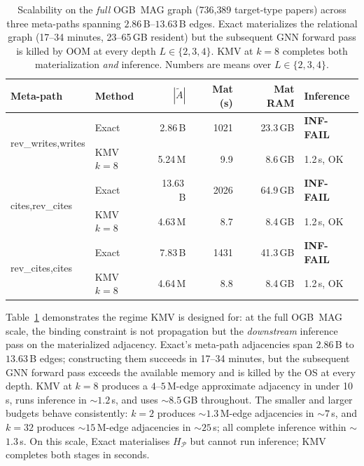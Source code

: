 \documentclass[sigconf]{acmart}
\begin{document}
\begin{table}[t]
\caption{Scalability on the \emph{full} OGB~MAG graph (736{,}389 target-type papers) across three meta-paths spanning $2.86$\,B--$13.63$\,B edges. Exact materializes the relational graph (17--34 minutes, 23--65\,GB resident) but the subsequent GNN forward pass is killed by OOM at every depth $L \in \{2,3,4\}$. KMV at $k{=}8$ completes both materialization \emph{and} inference. Numbers are means over $L \in \{2,3,4\}$.}
\label{tab:scalability}
\centering\scriptsize
\setlength{\tabcolsep}{4pt}
\begin{tabular}{l l r r r l}
\toprule
Meta-path & Method & $|\widetilde{A}|$ & Mat (s) & Mat RAM & Inference \\
\midrule
\multirow{2}{*}{rev\_writes,writes}
  & Exact       & 2.86\,B & 1021 & 23.3\,GB & \textbf{\color{red}INF-FAIL} \\
  & KMV $k{=}8$ & 5.24\,M & 9.9  & 8.6\,GB  & 1.2\,s, OK \\
\midrule
\multirow{2}{*}{cites,rev\_cites}
  & Exact       & 13.63\,B & 2026 & 64.9\,GB & \textbf{\color{red}INF-FAIL} \\
  & KMV $k{=}8$ & 4.63\,M  & 8.7  & 8.4\,GB  & 1.2\,s, OK \\
\midrule
\multirow{2}{*}{rev\_cites,cites}
  & Exact       & 7.83\,B & 1431 & 41.3\,GB & \textbf{\color{red}INF-FAIL} \\
  & KMV $k{=}8$ & 4.64\,M & 8.8  & 8.4\,GB  & 1.2\,s, OK \\
\bottomrule
\end{tabular}
\end{table}

Table~\ref{tab:scalability} demonstrates the regime KMV is designed for: at the full OGB~MAG~\cite{hu2020ogb} scale, the binding constraint is not propagation but the \emph{downstream} inference pass on the materialized adjacency.
Exact's meta-path adjacencies span $2.86$\,B to $13.63$\,B edges; constructing them succeeds in 17--34 minutes, but the subsequent GNN forward pass exceeds the available memory and is killed by the OS at every depth.
KMV at $k{=}8$ produces a $4$--$5$\,M-edge approximate adjacency in under 10\,s, runs inference in $\sim$$1.2$\,s, and uses $\sim$$8.5$\,GB throughout.
The smaller and larger budgets behave consistently: $k{=}2$ produces $\sim$$1.3$\,M-edge adjacencies in $\sim$$7$\,s, and $k{=}32$ produces $\sim$$15$\,M-edge adjacencies in $\sim$$25$\,s; all complete inference within $\sim$$1.3$\,s.
On this scale, Exact materialises $H_\mathcal{P}$ but cannot run inference; KMV completes both stages in seconds.
\end{document}
